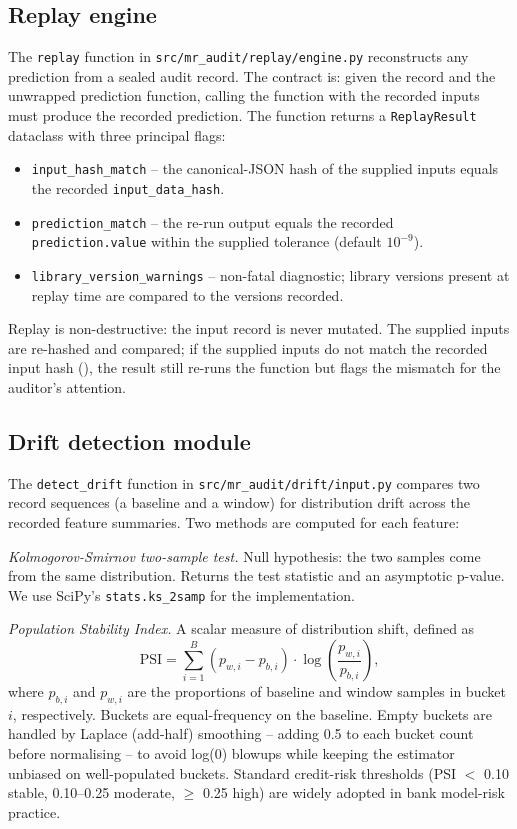 \subsection{Replay engine}\label{sec:replay}

The \texttt{replay} function in \texttt{src/mr\_audit/replay/engine.py} reconstructs any prediction from a sealed audit record. The contract is: given the record and the unwrapped prediction function, calling the function with the recorded inputs must produce the recorded prediction. The function returns a \texttt{ReplayResult} dataclass with three principal flags:

\begin{itemize}[leftmargin=*]
    \item \texttt{input\_hash\_match} -- the canonical-JSON hash of the supplied inputs equals the recorded \texttt{input\_data\_hash}.
    \item \texttt{prediction\_match} -- the re-run output equals the recorded \texttt{prediction.value} within the supplied tolerance (default $10^{-9}$).
    \item \texttt{library\_version\_warnings} -- non-fatal diagnostic; library versions present at replay time are compared to the versions recorded.
\end{itemize}

Replay is non-destructive: the input record is never mutated. The supplied inputs are re-hashed and compared; if the supplied inputs do not match the recorded input hash (), the result still re-runs the function but flags the mismatch for the auditor's attention.

\subsection{Drift detection module}\label{sec:drift_module}

The \texttt{detect\_drift} function in \texttt{src/mr\_audit/drift/input.py} compares two record sequences (a baseline and a window) for distribution drift across the recorded feature summaries. Two methods are computed for each feature:

\textit{Kolmogorov-Smirnov two-sample test.} Null hypothesis: the two samples come from the same distribution. Returns the test statistic and an asymptotic p-value. We use SciPy's \texttt{stats.ks\_2samp} for the implementation.

\textit{Population Stability Index.} A scalar measure of distribution shift, defined as
\[
\text{PSI} = \sum_{i=1}^{B} (p_{w,i} - p_{b,i}) \cdot \log\left(\frac{p_{w,i}}{p_{b,i}}\right),
\]
where $p_{b,i}$ and $p_{w,i}$ are the proportions of baseline and window samples in bucket $i$, respectively. Buckets are equal-frequency on the baseline. Empty buckets are handled by Laplace (add-half) smoothing -- adding 0.5 to each bucket count before normalising -- to avoid log(0) blowups while keeping the estimator unbiased on well-populated buckets. Standard credit-risk thresholds (PSI $<$ 0.10 stable, 0.10--0.25 moderate, $\geq$ 0.25 high) are widely adopted in bank model-risk practice.

